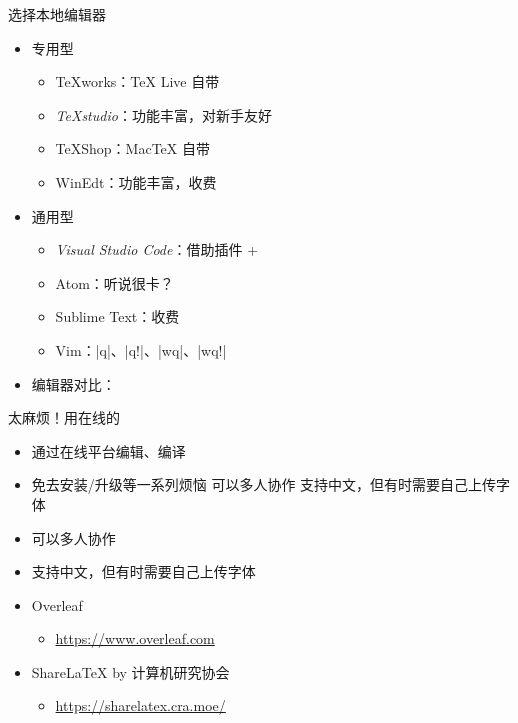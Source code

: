 \begin{frame}[fragile]{选择本地编辑器}
	\begin{itemize}
		\item<+-> 专用型
		      \begin{itemize}
			      \item TeXworks：\TeX{} Live 自带 \faWindows{} \faApple{} \faLinux{}
			      \item \emph{TeXstudio}：功能丰富，对新手友好 \faWindows{} \faApple{} \faLinux{}
			      \item TeXShop：Mac\TeX{} 自带 \faApple{}
			      \item WinEdt：功能丰富，收费 \faWindows{}
		      \end{itemize}

		\item<+-> 通用型

		      \begin{itemize}
			      \item \emph{Visual Studio Code}：借助插件   + 
			      \item Atom：听说很卡？
			      \item Sublime Text：收费
			      \item Vim：|q|、|q!|、|wq|、|wq!|
		      \end{itemize}

		\item<+-> 编辑器对比：
	\end{itemize}
\end{frame}


\begin{frame}[fragile]{太麻烦！用在线的}

	\begin{itemize}
		\item 通过在线平台编辑、编译
		\item 免去安装/升级等一系列烦恼 可以多人协作 支持中文，但有时需要自己上传字体
		\item 可以多人协作
		\item 支持中文，但有时需要自己上传字体
	\end{itemize}

	\begin{itemize}
		\item Overleaf
		      \begin{itemize}
			      \item \url{https://www.overleaf.com}
		      \end{itemize}
		\item ShareLaTeX by 计算机研究协会
		      \begin{itemize}
			      \item \url{https://sharelatex.cra.moe/}
		      \end{itemize}
	\end{itemize}
\end{frame}

